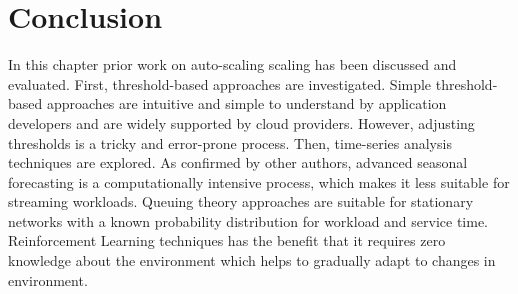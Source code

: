 \section{Conclusion}
\label{related:sum}

In this chapter prior work on auto-scaling scaling has been discussed and evaluated. First, threshold-based approaches are investigated. Simple threshold-based approaches are intuitive and simple to understand by application developers and are widely supported by cloud providers. However, adjusting thresholds is a tricky and error-prone process. Then, time-series analysis techniques are explored. As confirmed by other authors, advanced seasonal forecasting is a computationally intensive process, which makes it less suitable for streaming workloads. Queuing theory approaches are suitable for stationary networks with a known probability distribution for workload and service time. Reinforcement Learning techniques has the benefit that it requires zero knowledge about the environment which helps to gradually adapt to changes in environment.